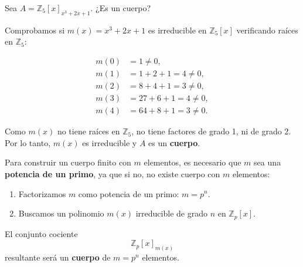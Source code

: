 \documentclass[a4paper,12pt]{article}
\begin{document}
\begin{ejemplo}[title=Ejemplo: Comprobación de que \(A\) es un cuerpo]
Sea \(A = \mathbb{Z}_5[x]_{x^3+2x+1}\). ¿Es un cuerpo?

\vspace{0.5em}

Comprobamos si \(m(x) = x^3 + 2x + 1\) es irreducible en \(\mathbb{Z}_5[x]\) verificando raíces en \(\mathbb{Z}_5\):

\[
\begin{aligned}
m(0) &= 1 \neq 0, \\
m(1) &= 1 + 2 + 1 = 4 \neq 0, \\
m(2) &= 8 + 4 + 1 = 3 \neq 0, \\
m(3) &= 27 + 6 + 1 = 4 \neq 0, \\
m(4) &= 64 + 8 + 1 = 3 \neq 0.
\end{aligned}
\]

Como \(m(x)\) no tiene raíces en \(\mathbb{Z}_5\), no tiene factores de grado 1, ni de grado 2.  
Por lo tanto, \(m(x)\) es irreducible y \(A\) es un \textbf{cuerpo}.
\end{ejemplo}

\begin{procedimiento}[title=Cómo construir un cuerpo con \(m\) elementos]

Para construir un cuerpo finito con \(m\) elementos, es necesario que \(m\) sea una \textbf{potencia de un primo}, ya que si no, no existe cuerpo con \(m\) elementos:

\begin{enumerate}
    \item Factorizamos \(m\) como potencia de un primo: \(m = p^n\).  
    \item Buscamos un polinomio \(m(x)\) irreducible de grado \(n\) en \(\mathbb{Z}_p[x]\).  
\end{enumerate}

El conjunto cociente
\[
\mathbb{Z}_p[x]_{m(x)}
\]
resultante será un \textbf{cuerpo} de \(m = p^n\) elementos.

\end{procedimiento}
\end{document}
